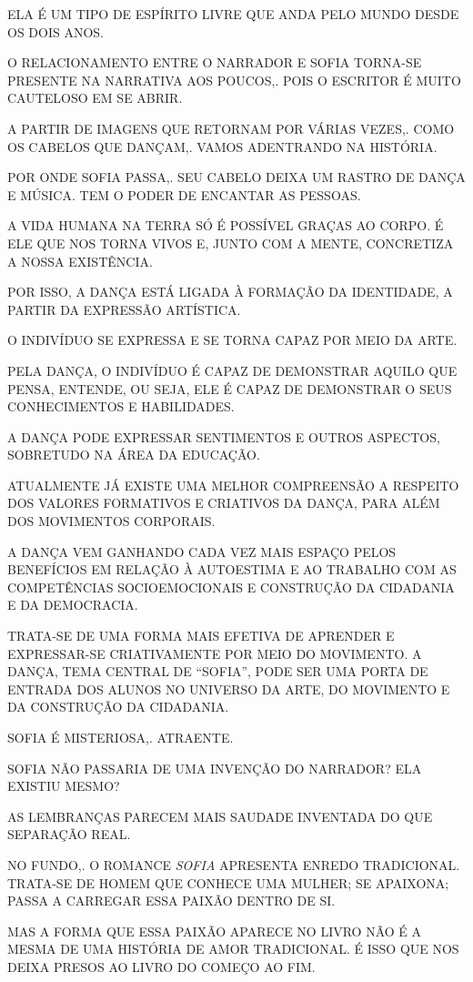 \documentclass{extarticle}
\begin{document}
ELA É UM TIPO DE ESPÍRITO LIVRE QUE ANDA PELO MUNDO DESDE OS DOIS ANOS.
 
O RELACIONAMENTO ENTRE O NARRADOR E SOFIA TORNA-SE PRESENTE NA NARRATIVA
AOS POUCOS,. POIS O ESCRITOR É MUITO CAUTELOSO EM SE ABRIR.
 
A PARTIR DE IMAGENS QUE RETORNAM POR VÁRIAS VEZES,. COMO OS CABELOS QUE
DANÇAM,. VAMOS ADENTRANDO NA HISTÓRIA.
 
POR ONDE SOFIA PASSA,. SEU CABELO DEIXA UM RASTRO DE DANÇA E MÚSICA. TEM
O PODER DE ENCANTAR AS PESSOAS.

A VIDA HUMANA NA TERRA SÓ É POSSÍVEL GRAÇAS AO CORPO. É ELE QUE NOS
TORNA VIVOS E, JUNTO COM A MENTE, CONCRETIZA A NOSSA EXISTÊNCIA.~
 
POR ISSO, A DANÇA ESTÁ LIGADA À FORMAÇÃO DA IDENTIDADE, A PARTIR DA
EXPRESSÃO ARTÍSTICA.
 
O INDIVÍDUO SE EXPRESSA E SE TORNA CAPAZ POR MEIO DA ARTE.
 
PELA DANÇA, O INDIVÍDUO É CAPAZ DE DEMONSTRAR AQUILO QUE PENSA, ENTENDE,
OU SEJA, ELE É CAPAZ DE DEMONSTRAR O SEUS CONHECIMENTOS E HABILIDADES.
 
A DANÇA PODE EXPRESSAR SENTIMENTOS E OUTROS ASPECTOS, SOBRETUDO NA ÁREA
DA EDUCAÇÃO.
 
ATUALMENTE JÁ EXISTE UMA MELHOR COMPREENSÃO A RESPEITO DOS VALORES
FORMATIVOS E CRIATIVOS DA DANÇA, PARA ALÉM DOS MOVIMENTOS CORPORAIS.
 
A DANÇA VEM GANHANDO CADA VEZ MAIS ESPAÇO PELOS BENEFÍCIOS EM RELAÇÃO À
AUTOESTIMA E AO TRABALHO COM AS COMPETÊNCIAS SOCIOEMOCIONAIS E
CONSTRUÇÃO DA CIDADANIA E DA DEMOCRACIA.
 
TRATA-SE DE UMA FORMA MAIS EFETIVA DE APRENDER E EXPRESSAR-SE
CRIATIVAMENTE POR MEIO DO MOVIMENTO. A DANÇA, TEMA CENTRAL DE ``SOFIA'',
PODE SER UMA PORTA DE ENTRADA DOS ALUNOS NO UNIVERSO DA ARTE, DO
MOVIMENTO E DA CONSTRUÇÃO DA CIDADANIA.

SOFIA É MISTERIOSA,. ATRAENTE.
 
SOFIA NÃO PASSARIA DE UMA INVENÇÃO DO NARRADOR? ELA EXISTIU MESMO?
 
AS LEMBRANÇAS PARECEM MAIS SAUDADE INVENTADA DO QUE SEPARAÇÃO REAL.
 
NO FUNDO,. O ROMANCE \emph{SOFIA} APRESENTA ENREDO TRADICIONAL. TRATA-SE
DE HOMEM QUE CONHECE UMA MULHER; SE APAIXONA; PASSA A CARREGAR ESSA
PAIXÃO DENTRO DE SI.
 
MAS A FORMA QUE ESSA PAIXÃO APARECE NO LIVRO NÃO É A MESMA DE UMA
HISTÓRIA DE AMOR TRADICIONAL. É ISSO QUE NOS DEIXA PRESOS AO LIVRO DO
COMEÇO AO FIM.
\end{document}
